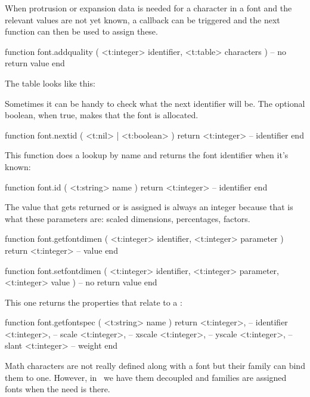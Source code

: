 {When protrusion or expansion data is needed for a character in a font and the
relevant values are not yet known, a callback can be triggered and the next function
can then be used to assign these.

\starttyping [option=LUA]
function font.addquality (
    <t:integer> identifier,
    <t:table>   characters
)
    -- no return value
end
\stoptyping

The table looks like this:

\stoptyping

Sometimes it can be handy to check what the next identifier will be. The optional
boolean, when true, makes that the font is allocated.

\starttyping [option=LUA]
function font.nextid ( <t:nil> | <t:boolean> )
    return <t:integer> -- identifier
end
\stoptyping

This function does a lookup by name and returns the font identifier when it's
known:

\starttyping [option=LUA]
function font.id ( <t:string> name )
    return <t:integer> -- identifier
end
\stoptyping

The value that gets returned or is assigned is always an integer because that is
what these parameters are: scaled dimensions, percentages, factors.

\starttyping [option=LUA]
function font.getfontdimen (
    <t:integer> identifier,
    <t:integer> parameter
)
    return <t:integer> -- value
end
\stoptyping

\starttyping [option=LUA]
function font.setfontdimen (
    <t:integer> identifier,
    <t:integer> parameter,
    <t:integer> value
)
    -- no return value
end
\stoptyping

This one returns the properties that relate to a \type {\fontspecdef}:

\starttyping [option=LUA]
function font.getfontspec ( <t:string> name )
    return
        <t:integer>, -- identifier
        <t:integer>, -- scale
        <t:integer>, -- xscale
        <t:integer>, -- yscale
        <t:integer>, -- slant
        <t:integer>  -- weight
end
\stoptyping

Math characters are not really defined along with a font but their family can
bind them to one. However, in \CONTEXT\ we have them decoupled and families are
assigned fonts when the need is there.

}
